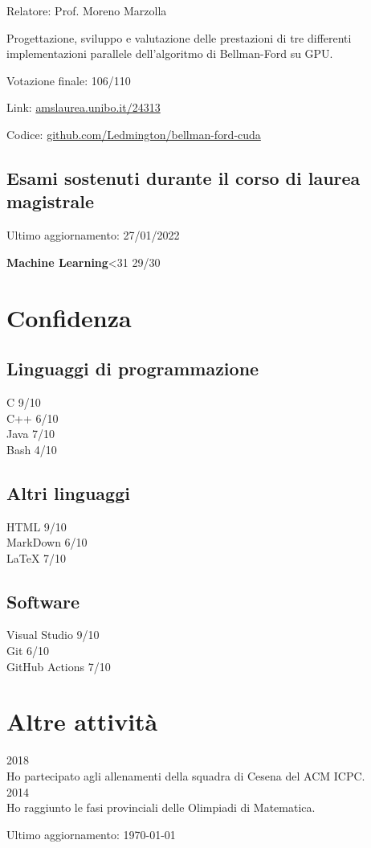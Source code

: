\documentclass{article}
\newcommand{\years}[1]{{\large #1}\\}
\newcommand{\https}[1]{\href{https://#1}{#1}}
\newcommand{\exam}[2]{\textbf{#1}\hfill \ifnum #2<31 {\Large #2}{\small /30} \else {\Large 30}{\small /30 con lode} \fi\\}
\newcommand{\skill}[2]{#1 #2/10}
\begin{document}
	Relatore: Prof. Moreno Marzolla
	
	Progettazione, sviluppo e valutazione delle prestazioni di tre differenti implementazioni parallele dell'algoritmo di Bellman-Ford su GPU.
	
	Votazione finale: 106/110
	
	Link: \https{amslaurea.unibo.it/24313}
	
	Codice: \https{github.com/Ledmington/bellman-ford-cuda}
	
	\subsection*{Esami sostenuti durante il corso di laurea magistrale}
	{\small Ultimo aggiornamento: 27/01/2022}
	\medskip
	
	\begin{minipage}[t]{.47\textwidth}
		\exam{Machine Learning}{29}
	\end{minipage}
	\hfill
	\begin{minipage}[t]{.47\textwidth}
	\end{minipage}
	
	\section*{Confidenza}
	\subsection*{Linguaggi di programmazione}
	\skill{C}{9}\\
	\skill{C++}{6}\\
	\skill{Java}{7}\\
	\skill{Bash}{4}
	
	\subsection*{Altri linguaggi}
	\skill{HTML}{9}\\
	\skill{MarkDown}{6}\\
	\skill{\LaTeX}{7}
	
	\subsection*{Software}
	\skill{Visual Studio}{9}\\
	\skill{Git}{6}\\
	\skill{GitHub Actions}{7}
	
	\section*{Altre attività}
	\years{2018} Ho partecipato agli allenamenti della squadra di Cesena del ACM ICPC.\\
	
	\years{2014} Ho raggiunto le fasi provinciali delle Olimpiadi di Matematica.
	
	\vfill
	\begin{center}
		\scriptsize
		Ultimo aggiornamento: \today
	\end{center}
	
\end{document}
